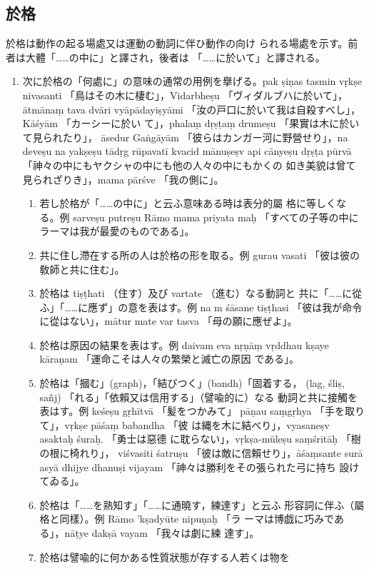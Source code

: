 \subsection{於格}
\numberParagraph
於格は動作の起る場處又は運動の動詞に伴ひ動作の向け
られる場處を示す。前者は大體「……の中に」と譯され，後者は
「……に於いて」と譯される。
\begin{enumerate}[label=(\arabic*)]
\item 次に於格の「何處に」の意味の通常の用例を擧げる。pak\-%
ṣiṇas tasmin vṛkṣe nivasanti 「鳥はその木に棲む」，Vidarbheṣu
「ヴィダルブハに於いて」，ātmānaṃ tava dvāri vyāpādayiṣyāmi
「汝の戸口に於いて我は自殺すべし」，Kāśyām 「カーシーに於い
て」，phalaṃ dṛṣṭaṃ drumeṣu 「果實は木に於いて見られたり」，
āsedur Gaṅgāyām 「彼らはカンガー河に野營せり」，na deveṣu na
yakṣeṣu tādṛg rūpavatī kvacid mānuṣeṣv api cānyeṣu dṛṣṭa\-%
pūrvā 「神々の中にもヤクシャの中にも他の人々の中にもかくの
如き美貌は曾て見られざりき」，mama pārśve 「我の側に」。
\begin{enumerate}[label=(\alph*)]
\item 若し於格が「……の中に」と云ふ意味ある時は表分的屬
格に等しくなる。例 sarveṣu putreṣu Rāmo mama priyata\-%
maḥ 「すべての子等の中にラーマは我が最愛のものである」。
\item 共に住し滯在する所の人は於格の形を取る。例 gurau
vasati 「彼は彼の敎師と共に住む」。
\item 於格は tiṣṭhati （住す）及び vartate （進む）なる動詞と
共に「……に從ふ」「……に應ず」の意を表はす。例 na m
śāsane tiṣṭhasi 「彼は我が命令に從はない」，mātur mate var\-%
tasva 「母の願に應ぜよ」。
\item 於格は原因の結果を表はす。例 daivam eva nṛṇāṃ
vṛddhau kṣaye kāraṇam 「運命こそは人々の繁榮と滅亡の原因
である」。
\item 於格は「摑む」(graph)，「結びつく」(bandh)「固着する，
(lag, śliṣ, sañj) 「れる」「依賴又は信用する」（譬喩的に）なる
動詞と共に接觸を表はす。例 keśeṣu gṛhītvā 「髪をつかみて」
pāṇau saṃgṛhya 「手を取りて」，vṛkṣe pāśaṃ babandha 「彼
は縄を木に結べり」，vyasaneṣv asaktaḥ śuraḥ. 「勇士は惡德
に耽らない」，vṛkṣa-mūleṣu saṃśritāḥ 「樹の根に椅れり」，
viśvasiti śatruṣu 「彼は敵に信賴せり」，āśaṃsante surā asyā\-%
dhijye dhanuṣi vijayam 「神々は勝利をその張られた弓に持ち
設けてゐる」。
\item 於格は「……を熟知す」「……に通曉す，練達す」と云ふ
形容詞に伴ふ（屬格と同樣）。例 Rāmo 'kṣadyūte nipuṇaḥ 「ラ
ーマは博戯に巧みである」，nāṭye dakṣā vayam 「我々は劇に練
達す」。
\item 於格は譬喩的に何かある性質狀態が存する人若くは物を

\end{enumerate}
\end{enumerate}
